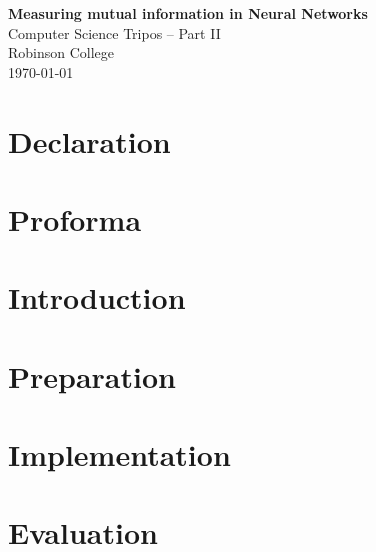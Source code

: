 \documentclass[12pt,a4paper]{report}
\begin{document}





\pagestyle{empty}


\vspace*{60mm}
\begin{center}
\Huge
\textbf{Measuring mutual information in Neural Networks} \\[5mm]
Computer Science Tripos -- Part II \\[5mm]
Robinson College \\[5mm]
\today  %
\end{center}


\pagestyle{plain}

\chapter*{Declaration}


\chapter*{Proforma}


\tableofcontents
\listoffigures


\pagestyle{headings}

\chapter{Introduction}


\chapter{Preparation}


\chapter{Implementation}



\chapter{Evaluation}

\end{document}

